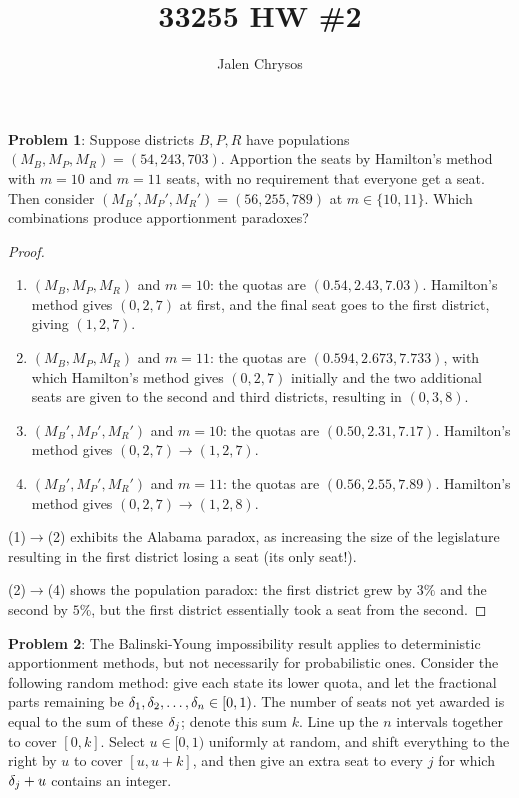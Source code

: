 \documentclass{amsart}
\title{33255 HW \#2}
\author{Jalen Chrysos}
\begin{document}
	
	\maketitle
	\textbf{Problem 1}: Suppose districts $B,P,R$ have populations $(M_B,M_P,M_R)=(54,243,703)$. Apportion the seats by Hamilton's method with $m=10$ and $m=11$ seats, with no requirement that everyone get a seat. Then consider $(M_B',M_P',M_R')=(56,255,789)$ at $m\in \{10,11\}$. Which combinations produce apportionment paradoxes?
	\begin{proof}
		\begin{enumerate}[(1)]
			\item $(M_B,M_P,M_R)$ and $m=10$: the quotas are $(0.54,2.43,7.03)$. Hamilton's method gives $(0,2,7)$ at first, and the final seat goes to the first district, giving $(1,2,7)$.
			\item $(M_B,M_P,M_R)$ and  $m=11$: the quotas are $(0.594,2.673,7.733)$, with which Hamilton's method gives $(0,2,7)$ initially and the two additional seats are given to the second and third districts, resulting in $(0,3,8)$.
			\item $(M_B',M_P',M_R')$ and $m=10$: the quotas are $(0.50,2.31,7.17)$. Hamilton's method gives $(0,2,7)\to (1,2,7)$.
			\item $(M_B',M_P',M_R')$ and $m=11$: the quotas are $(0.56,2.55,7.89)$. Hamilton's method gives $(0,2,7)\to (1,2,8)$.
		\end{enumerate}
		
		(1)$\to$(2) exhibits the Alabama paradox, as increasing the size of the legislature resulting in the first district losing a seat (its only seat!). 
		
		(2)$\to$(4) shows the population paradox: the first district grew by $3\%$ and the second by $5\%$, but the first district essentially took a seat from the second.
	\end{proof}
	
	\newpage 
	
	\textbf{Problem 2}: The Balinski-Young impossibility result applies to deterministic apportionment methods, but not necessarily for probabilistic ones. Consider the following random method: give each state its lower quota, and let the fractional parts remaining be $\delta_1,\delta_2,\dots,\delta_n\in [0,1)$. The number of seats not yet awarded is equal to the sum of these $\delta_j$; denote this sum $k$. Line up the $n$ intervals together to cover $[0,k]$. Select $u\in [0,1)$ uniformly at random, and shift everything to the right by $u$ to cover $[u,u+k]$, and then give an extra seat to every $j$ for which $\delta_j+u$ contains an integer.
	
\end{document}
